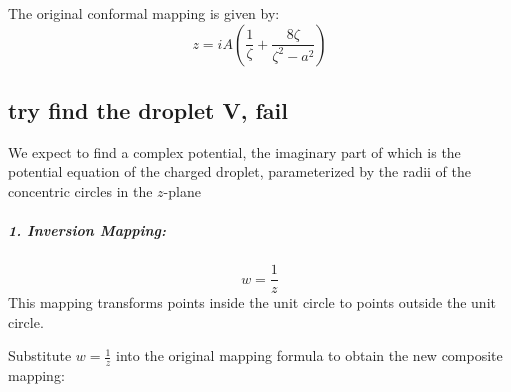 
The original conformal mapping is given by:
\[
z = i A \left( \frac{1}{\zeta} + \frac{8\zeta}{\zeta^2 - a^2} \right)
\]





\subsection{try find the droplet V, fail}
We expect to find a complex potential, the imaginary part of which is the potential equation of the charged droplet, parameterized by the radii of the concentric circles in the $z$-plane
\subparagraph{1. Inversion Mapping:}
\[
w = \frac{1}{z}
\]
This mapping transforms points inside the unit circle to points outside the unit circle.


Substitute \( w = \frac{1}{z} \) into the original mapping formula to obtain the new composite mapping:

